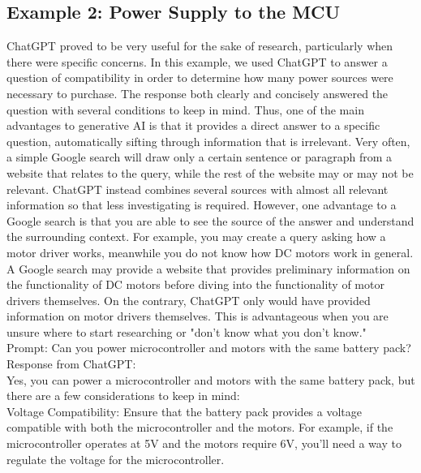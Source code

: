 \subsection{Example 2: Power Supply to the MCU}
\noindent ChatGPT proved to be very useful for the sake of research, particularly when there were specific concerns. In this example, we used ChatGPT to answer a question of compatibility in order to determine how many power sources were necessary to purchase. The response both clearly and concisely answered the question with several conditions to keep in mind. Thus, one of the main advantages to generative AI is that it provides a direct answer to a specific question, automatically sifting through information that is irrelevant. Very often, a simple Google search will draw only a certain sentence or paragraph from a website that relates to the query, while the rest of the website may or may not be relevant. ChatGPT instead combines several sources with almost all relevant information so that less investigating is required. However, one advantage to a Google search is that you are able to see the source of the answer and understand the surrounding context. For example, you may create a query asking how a motor driver works, meanwhile you do not know how DC motors work in general. A Google search may provide a website that provides preliminary information on the functionality of DC motors before diving into the functionality of motor drivers themselves. On the contrary, ChatGPT only would have provided information on motor drivers themselves. This is advantageous when you are unsure where to start researching or "don't know what you don't know."\\

\noindent Prompt: Can you power microcontroller and motors with the same battery pack?\\

\noindent Response from ChatGPT:\\

\noindent Yes, you can power a microcontroller and motors with the same battery pack, but there are a few considerations to keep in mind:\\

\noindent Voltage Compatibility: Ensure that the battery pack provides a voltage compatible with both the microcontroller and the motors. For example, if the microcontroller operates at 5V and the motors require 6V, you'll need a way to regulate the voltage for the microcontroller.\\

